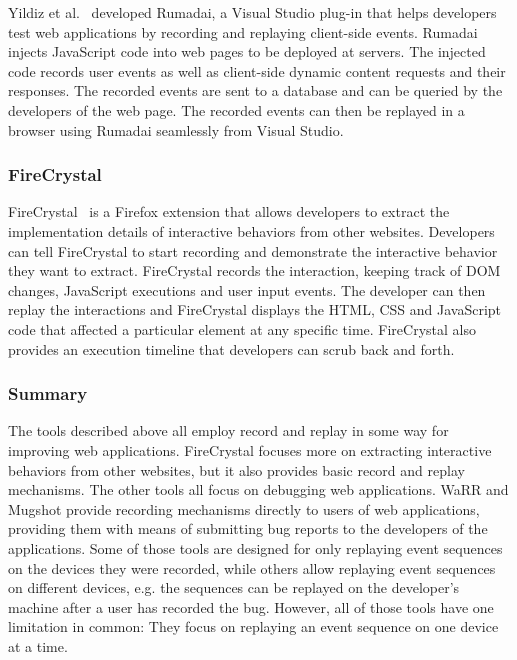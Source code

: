 Yildiz et al.~\cite{rumadai2012} developed Rumadai, a Visual Studio plug-in that helps developers test web applications by recording and replaying client-side events. Rumadai injects JavaScript code into web pages to be deployed at servers. The injected code records user events as well as client-side dynamic content requests and their responses. The recorded events are sent to a database and can be queried by the developers of the web page. The recorded events can then be replayed in a browser using Rumadai seamlessly from Visual Studio.

\subsubsection{FireCrystal}

FireCrystal~\cite{firecrystal2009} is a Firefox extension that allows developers to extract the implementation details of interactive behaviors from other websites. Developers can tell FireCrystal to start recording and demonstrate the interactive behavior they want to extract. FireCrystal records the interaction, keeping track of DOM changes, JavaScript executions and user input events. The developer can then replay the interactions and FireCrystal displays the HTML, CSS and JavaScript code that affected a particular element at any specific time. FireCrystal also provides an execution timeline that developers can scrub back and forth.

\subsubsection{Summary}

The tools described above all employ record and replay in some way for improving web applications. FireCrystal focuses more on extracting interactive behaviors from other websites, but it also provides basic record and replay mechanisms. The other tools all focus on debugging web applications. WaRR and Mugshot provide recording mechanisms directly to users of web applications, providing them with means of submitting bug reports to the developers of the applications. Some of those tools are designed for only replaying event sequences on the devices they were recorded, while others allow replaying event sequences on different devices, e.g. the sequences can be replayed on the developer's machine after a user has recorded the bug. However, all of those tools have one limitation in common: They focus on replaying an event sequence on one device at a time. 

